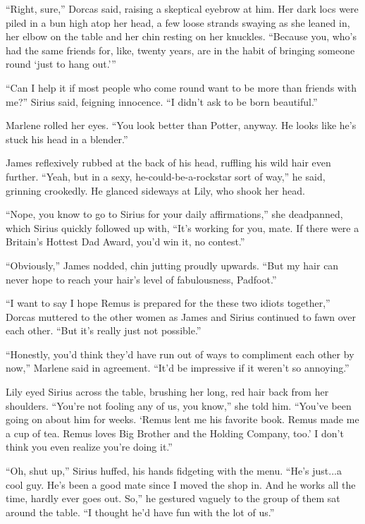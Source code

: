 “Right, sure,” Dorcas said, raising a skeptical eyebrow at him. Her dark locs were piled in a bun high atop her head, a few loose strands swaying as she leaned in, her elbow on the table and her chin resting on her knuckles. “Because you, who’s had the same friends for, like, twenty years, are in the habit of bringing someone round ‘just to hang out.’”

“Can I help it if most people who come round want to be more than friends with me?” Sirius said, feigning innocence. “I didn’t ask to be born beautiful.”

Marlene rolled her eyes. “You look better than Potter, anyway. He looks like he’s stuck his head in a blender.”

James reflexively rubbed at the back of his head, ruffling his wild hair even further. “Yeah, but in a sexy, he-could-be-a-rockstar sort of way,” he said, grinning crookedly. He glanced sideways at Lily, who shook her head.

“Nope, you know to go to Sirius for your daily affirmations,” she deadpanned, which Sirius quickly followed up with, “It’s working for you, mate. If there were a Britain’s Hottest Dad Award, you’d win it, no contest.”

“Obviously,” James nodded, chin jutting proudly upwards. “But my hair can never hope to reach your hair’s level of fabulousness, Padfoot.”

“I want to say I hope Remus is prepared for the these two idiots together,” Dorcas muttered to the other women as James and Sirius continued to fawn over each other. “But it’s really just not possible.”

“Honestly, you’d think they’d have run out of ways to compliment each other by now,” Marlene said in agreement. “It’d be impressive if it weren’t so annoying.”

Lily eyed Sirius across the table, brushing her long, red hair back from her shoulders. “You’re not fooling any of us, you know,” she told him. “You’ve been going on about him for weeks. ‘Remus lent me his favorite book. Remus made me a cup of tea. Remus loves Big Brother and the Holding Company, too.’ I don’t think you even realize you’re doing it.”

“Oh, shut up,” Sirius huffed, his hands fidgeting with the menu. “He’s just...a cool guy. He’s been a good mate since I moved the shop in. And he works all the time, hardly ever goes out. So,” he gestured vaguely to the group of them sat around the table. “I thought he’d have fun with the lot of us.”

